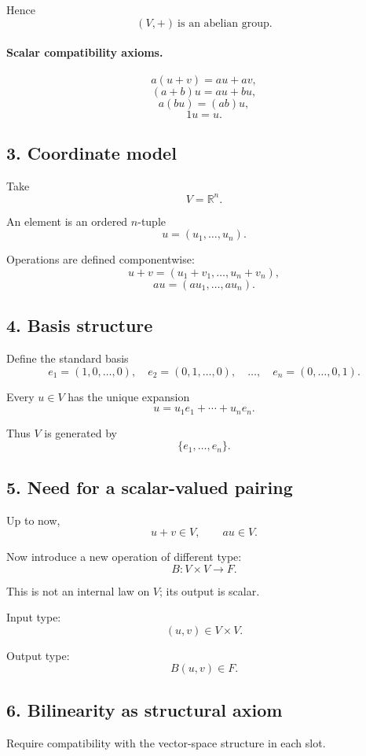 \documentclass{article}
\begin{document}
	Hence
	$$
	(V,+)\ \text{is an abelian group}.
	$$
	
	\paragraph{Scalar compatibility axioms.}
	$$
	a(u+v)=au+av,
	$$
	$$
	(a+b)u=au+bu,
	$$
	$$
	a(bu)=(ab)u,
	$$
	$$
	1u=u.
	$$
	
	\subsection*{3. Coordinate model}
	
	Take
	$$
	V=\mathbb{R}^n.
	$$
	
	An element is an ordered $n$-tuple
	$$
	u=(u_1,\dots,u_n).
	$$
	
	Operations are defined componentwise:
	$$
	u+v=(u_1+v_1,\dots,u_n+v_n),
	$$
	$$
	au=(au_1,\dots,au_n).
	$$
	
	\subsection*{4. Basis structure}
	
	Define the standard basis
	$$
	e_1=(1,0,\dots,0),\quad
	e_2=(0,1,\dots,0),\quad \dots,\quad
	e_n=(0,\dots,0,1).
	$$
	
	Every $u\in V$ has the unique expansion
	$$
	u=u_1e_1+\cdots+u_ne_n.
	$$
	
	Thus $V$ is generated by
	$$
	\{e_1,\dots,e_n\}.
	$$
	
	\subsection*{5. Need for a scalar-valued pairing}
	
	Up to now,
	$$
	u+v\in V,\qquad au\in V.
	$$
	
	Now introduce a new operation of different type:
	$$
	B:V\times V\to F.
	$$
	
	This is not an internal law on $V$; its output is scalar.
	
	Input type:
	$$
	(u,v)\in V\times V.
	$$
	
	Output type:
	$$
	B(u,v)\in F.
	$$
	
	\subsection*{6. Bilinearity as structural axiom}
	
	Require compatibility with the vector-space structure in each slot.
	
\end{document}

